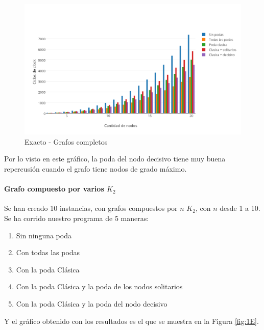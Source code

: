 \begin{figure}[htb]
	\begin{center}
    		\includegraphics[scale=0.8]{imagenes/exacto-completos.png}
	\end{center}
	\caption{Exacto - Grafos completos}\label{fig:1D}
\end{figure}

Por lo visto en este gráfico, la poda del nodo decisivo tiene muy buena repercusión cuando el grafo tiene nodos de grado máximo.

\paragraph{Grafo compuesto por varios $K_2$}

Se han creado 10 instancias, con grafos compuestos por $n$ $K_2$, con $n$ desde 1 a 10. Se ha corrido nuestro programa de 5 maneras:

\begin{enumerate}
	\item Sin ninguna poda
	\item Con todas las podas 
	\item Con la poda Clásica
	\item Con la poda Clásica y la poda de los nodos solitarios
	\item Con la poda Clásica y la poda del nodo decisivo
\end{enumerate}

Y el gráfico obtenido con los resultados es el que se muestra en la Figura \ref{fig:1E}.


